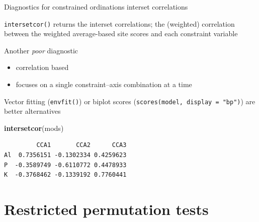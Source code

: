 \documentclass[10pt,ignorenonframetext,compress, aspectratio=169]{beamer}
\newenvironment{Shaded}{\begin{snugshade}}{\end{snugshade}}
\newcommand{\KeywordTok}[1]{\textcolor[rgb]{0.13,0.29,0.53}{\textbf{{#1}}}}
\newcommand{\NormalTok}[1]{{#1}}
\begin{document}
\begin{frame}[fragile]{Diagnostics for constrained ordinations
\textbar{} interset correlations}

\texttt{intersetcor()} returns the interset correlations; the (weighted)
correlation between the weighted average-based site scores and each
constraint variable

Another \emph{poor} diagnostic

\begin{itemize}
\itemsep1pt\parskip0pt
\item
  correlation based
\item
  focuses on a single constraint--axis combination at a time
\end{itemize}

Vector fitting (\texttt{envfit()}) or biplot scores
(\texttt{scores(model, display = "bp")}) are better alternatives

\scriptsize

\begin{Shaded}
\begin{Highlighting}[]
\KeywordTok{intersetcor}\NormalTok{(mods)}
\end{Highlighting}
\end{Shaded}

\begin{verbatim}
         CCA1       CCA2      CCA3
Al  0.7356151 -0.1302334 0.4259623
P  -0.3589749 -0.6110772 0.4478933
K  -0.3768462 -0.1339192 0.7760441
\end{verbatim}

\normalsize

\end{frame}

\section{Restricted permutation
tests}\label{restricted-permutation-tests}
\end{document}
